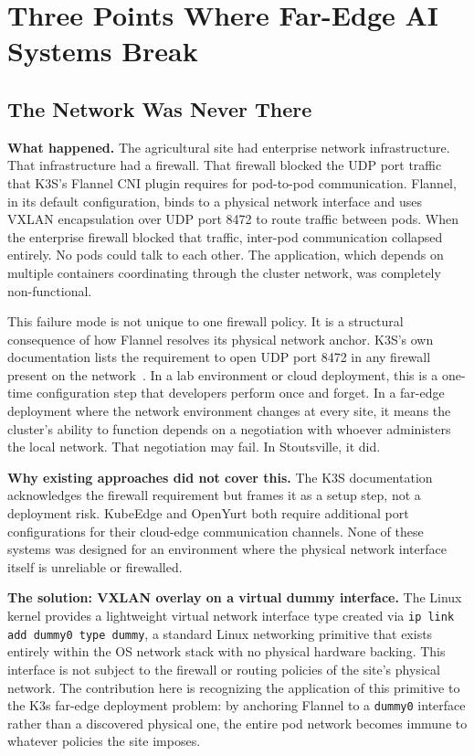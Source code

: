\section{Three Points Where Far-Edge AI Systems Break}
\label{sec:ch3_inflection_points}

\subsection{The Network Was Never There}
\label{subsec:ch3_network_mismatch}

\textbf{What happened.} The agricultural site had enterprise network infrastructure. That infrastructure had a firewall. That firewall blocked the UDP port traffic that K3S's Flannel CNI plugin requires for pod-to-pod communication. Flannel, in its default configuration, binds to a physical network interface and uses VXLAN encapsulation over UDP port 8472 to route traffic between pods. When the enterprise firewall blocked that traffic, inter-pod communication collapsed entirely. No pods could talk to each other. The application, which depends on multiple containers coordinating through the cluster network, was completely non-functional.

This failure mode is not unique to one firewall policy. It is a structural consequence of how Flannel resolves its physical network anchor. K3S's own documentation lists the requirement to open UDP port 8472 in any firewall present on the network~\cite{k3sdocs2024}. In a lab environment or cloud deployment, this is a one-time configuration step that developers perform once and forget. In a far-edge deployment where the network environment changes at every site, it means the cluster's ability to function depends on a negotiation with whoever administers the local network. That negotiation may fail. In Stoutsville, it did.

\textbf{Why existing approaches did not cover this.} The K3S documentation acknowledges the firewall requirement but frames it as a setup step, not a deployment risk. KubeEdge and OpenYurt both require additional port configurations for their cloud-edge communication channels. None of these systems was designed for an environment where the physical network interface itself is unreliable or firewalled.

\textbf{The solution: VXLAN overlay on a virtual dummy interface.} The Linux kernel provides a lightweight virtual network interface type created via \texttt{ip link add dummy0 type dummy}, a standard Linux networking primitive that exists entirely within the OS network stack with no physical hardware backing. This interface is not subject to the firewall or routing policies of the site's physical network. The contribution here is recognizing the application of this primitive to the K3s far-edge deployment problem: by anchoring Flannel to a \texttt{dummy0} interface rather than a discovered physical one, the entire pod network becomes immune to whatever policies the site imposes.

